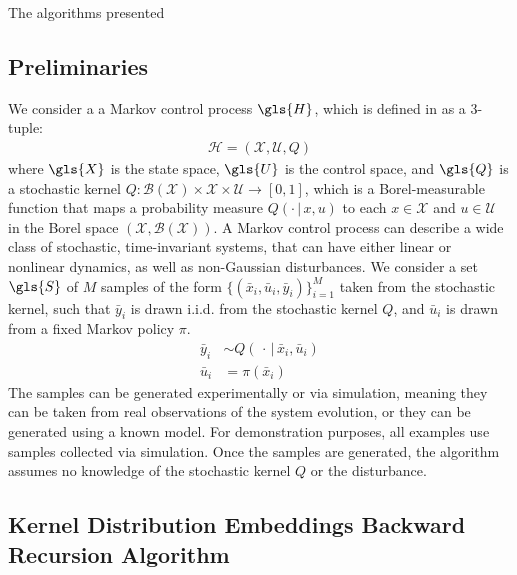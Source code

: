 \documentclass[11pt]{article}
\begin{document}
The algorithms presented


\subsection{Preliminaries}

We consider a a Markov control process $\gls{H}$, which is defined in \cite{summers} as a 3-tuple:
\begin{align}
  \mathcal{H} = (\mathcal{X}, \mathcal{U}, Q)
\end{align}
where $\gls{X}$ is the state space, $\gls{U}$ is the control space, and $\gls{Q}$ is a stochastic kernel
$Q : \mathscr{B}(\mathcal{X}) \times \mathcal{X} \times \mathcal{U} \rightarrow [0, 1]$, which is a Borel-measurable function that maps a probability measure $Q(\cdot \,|\, x, u)$ to each $x \in \mathcal{X}$ and $u \in \mathcal{U}$ in the Borel space $(\mathcal{X}, \mathscr{B}(\mathcal{X}))$.
A Markov control process can describe a wide class of stochastic, time-invariant systems, that can have either linear or nonlinear dynamics, as well as non-Gaussian disturbances.
%
We consider a set $\gls{S}$ of $M$ samples of the form
$\lbrace (\bar{x}_{i}, \bar{u}_{i}, \bar{y}_{i}) \rbrace_{i=1}^{M}$ taken from the stochastic kernel,
such that $\bar{y}_{i}$ is drawn i.i.d. from the stochastic kernel $Q$,
and $\bar{u}_{i}$ is drawn from a fixed Markov policy $\pi$.
\begin{align}
	\bar{y}_{i} &\sim Q(\,\cdot\,|\,\bar{x}_{i}, \bar{u}_{i}) \\
	\bar{u}_{i} &= \pi(\bar{x}_{i})
\end{align}
The samples can be generated experimentally or via simulation, meaning they can be taken from real observations of the system evolution, or they can be generated using a known model. For demonstration purposes, all examples use samples collected via simulation.
%
Once the samples are generated, the algorithm assumes no knowledge of the stochastic kernel $Q$ or the disturbance.


\subsection{Kernel Distribution Embeddings Backward Recursion Algorithm}


\end{document}

